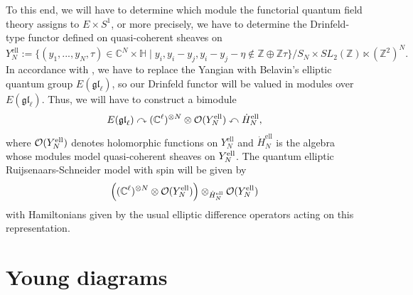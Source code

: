 \documentclass[11pt]{report}
\theoremstyle{definition}
\theoremstyle{remark}
\theoremstyle{remark}
\newcommand{\Z}{\mathbb{Z}}
\newcommand{\C}{\mathbb{C}}
\begin{document}
To this end, we will have to determine which module the functorial quantum field theory assigns to $E \times S^1$, or more precisely, we have to determine the Drinfeld-type functor defined on quasi-coherent sheaves on
\begin{equation*}
Y_N^\text{ell} := \{ (y_1,...,y_N,\tau) \in \C^N \times \mathbb{H} \mid y_i,y_i-y_j,y_i-y_j-\eta \notin \Z \oplus \Z \tau \}/S_N \times SL_2(\Z) \ltimes (\Z^2)^N.
\end{equation*}
In accordance with \cite{article:costello:2018b}, we have to replace the Yangian with Belavin's elliptic quantum group $E(\mathfrak{gl}_\ell)$, so our Drinfeld functor will be valued in modules over $E(\mathfrak{gl}_\ell)$. Thus, we will have to construct a bimodule
\begin{equation*}
E(\mathfrak{gl}_\ell) \curvearrowright (\C^\ell)^{\otimes N} \otimes \mathcal{O}(Y_N^\textnormal{ell}) \curvearrowleft \dot H_N^\text{ell},
\end{equation*}
where $\mathcal{O}(Y_N^\textnormal{ell})$ denotes holomorphic functions on $Y_N^\text{ell}$ and $\dot H_N^\text{ell}$ is the algebra whose modules model quasi-coherent sheaves on $Y_N^\textnormal{ell}$. The quantum elliptic Ruijsenaars-Schneider model with spin will be given by
\begin{equation*}
\Big( (\C^\ell)^{\otimes N} \otimes \mathcal{O}(Y_N^\textnormal{ell}) \Big) \otimes_{\dot H_N^\text{ell}} \mathcal{O}(Y_N^\textnormal{ell})
\end{equation*}
with Hamiltonians given by the usual elliptic difference operators acting on this representation.

\let\thefootnote\relax{}



\appendix \label{appendix}

\chapter{Young diagrams} \label{appendix:youngdiagrams}
\end{document}
